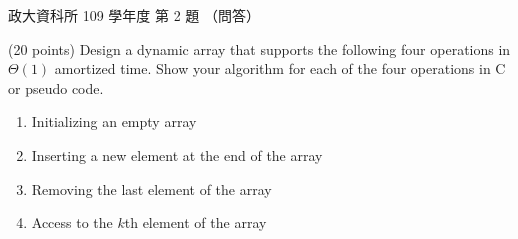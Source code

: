 \begin{pastexam}[label={px:nccu-109-dsa-02}]{政大資科所 109 學年度 第 2 題}
（問答）

(20 points) Design a dynamic array that supports the following four operations in $\Theta(1)$
amortized time. Show your algorithm for each of the four operations in C or pseudo code.
\begin{enumerate}[label=2.\arabic*]
\item Initializing an empty array
\item Inserting a new element at the end of the array
\item Removing the last element of the array
\item Access to the $k$th element of the array
\end{enumerate}
\end{pastexam}

